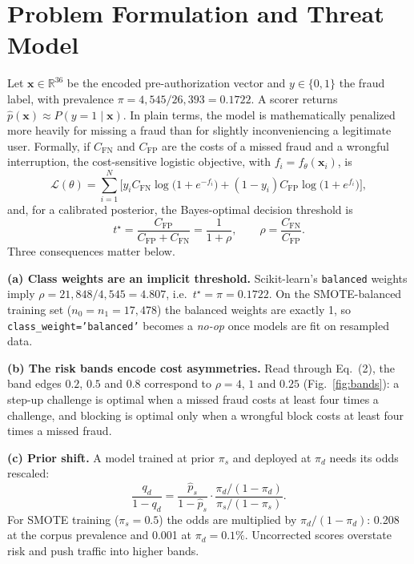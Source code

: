 \documentclass[conference]{IEEEtran}
\begin{document}
\section{Problem Formulation and Threat Model}
Let $\mathbf{x}\in\mathbb{R}^{36}$ be the encoded pre-authorization vector and $y\in\{0,1\}$ the fraud label, with prevalence $\pi=4{,}545/26{,}393=0.1722$. A scorer returns $\hat p(\mathbf{x})\approx P(y{=}1\mid\mathbf{x})$. In plain terms, the model is mathematically penalized more heavily for missing a fraud than for slightly inconveniencing a legitimate user. Formally, if $C_{\text{FN}}$ and $C_{\text{FP}}$ are the costs of a missed fraud and a wrongful interruption, the cost-sensitive logistic objective, with $f_i=f_\theta(\mathbf{x}_i)$, is
\begin{equation}
\mathcal{L}(\theta)=\sum_{i=1}^{N}\Big[y_iC_{\text{FN}}\log\!\big(1{+}e^{-f_i}\big)+(1{-}y_i)C_{\text{FP}}\log\!\big(1{+}e^{f_i}\big)\Big],
\end{equation}
and, for a calibrated posterior, the Bayes-optimal decision threshold is
\begin{equation}
t^\star=\frac{C_{\text{FP}}}{C_{\text{FP}}+C_{\text{FN}}}=\frac{1}{1+\rho},\qquad \rho=\frac{C_{\text{FN}}}{C_{\text{FP}}}.
\end{equation}
Three consequences matter below.

\textbf{(a) Class weights are an implicit threshold.} Scikit-learn's \texttt{balanced} weights imply $\rho=21{,}848/4{,}545=4.807$, i.e.\ $t^\star=\pi=0.1722$. On the SMOTE-balanced training set ($n_0=n_1=17{,}478$) the balanced weights are exactly 1, so \texttt{class\_\allowbreak{}weight='balanced'} becomes a \emph{no-op} once models are fit on resampled data.

\textbf{(b) The risk bands encode cost asymmetries.} Read through Eq.~(2), the band edges $0.2$, $0.5$ and $0.8$ correspond to $\rho=4$, $1$ and $0.25$ (Fig.~\ref{fig:bands}): a step-up challenge is optimal when a missed fraud costs at least four times a challenge, and blocking is optimal only when a wrongful block costs at least four times a missed fraud.

\textbf{(c) Prior shift.} A model trained at prior $\pi_s$ and deployed at $\pi_d$ needs its odds rescaled:
\begin{equation}
\frac{q_d}{1-q_d}=\frac{\hat p_s}{1-\hat p_s}\cdot\frac{\pi_d/(1-\pi_d)}{\pi_s/(1-\pi_s)}.
\end{equation}
For SMOTE training ($\pi_s=0.5$) the odds are multiplied by $\pi_d/(1-\pi_d)$: 0.208 at the corpus prevalence and 0.001 at $\pi_d=0.1\%$. Uncorrected scores overstate risk and push traffic into higher bands.
\end{document}
